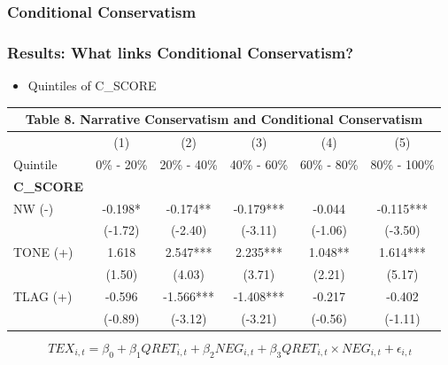 \documentclass{beamer}
\begin{document}
\begin{frame}
\begin{table}[H]
\begin{footnotesize}
	\end{footnotesize}
\end{table}%

	
\end{frame}
\begin{frame}
\frametitle{Conditional Conservatism}

\frametitle{Results: What links Conditional Conservatism?}
\begin{itemize}
	\item Quintiles of C\_SCORE
\end{itemize}

\medskip \pause

\begin{table}[H]	\label{T8}%
	\begin{center} \scriptsize
		\begin{tabular}{lccccc}
			\multicolumn{6}{c}{\textbf{Table 8. Narrative Conservatism and Conditional Conservatism}} \\
			\midrule
			\midrule
			& (1) & (2) & (3) & (4) & (5) \\
			Quintile & 0\% - 20\% & 20\% - 40\% & 40\% - 60\% & 60\% - 80\% & 80\% - 100\% \\
			\midrule
			\textbf{C\_SCORE} &  &  &  &  &  \\
			\midrule
			NW (-) & -0.198* & -0.174** & -0.179*** & -0.044 & -0.115*** \\
			& (-1.72) & (-2.40) & (-3.11) & (-1.06) & (-3.50) \\
			TONE (+) & 1.618 & 2.547*** & 2.235*** & 1.048** & 1.614*** \\
			& (1.50) & (4.03) & (3.71) & (2.21) & (5.17) \\
			TLAG (+) & -0.596 & -1.566*** & -1.408*** & -0.217 & -0.402 \\
			& (-0.89) & (-3.12) & (-3.21) & (-0.56) & (-1.11) \\
			\midrule
			\bottomrule
		\end{tabular}%
	\end{center}
	\begin{footnotesize}
		\setcounter{equation}{0}
		\begin{equation}
		TEX_{i,t}=\beta_0+\beta_1QRET_{i,t}+\beta_2NEG_{i,t}+\beta_3QRET_{i,t}\times NEG_{i,t}+\epsilon_{i,t}
		\end{equation}
		
	\end{footnotesize}
\end{table}%

\end{frame}
\end{document}
